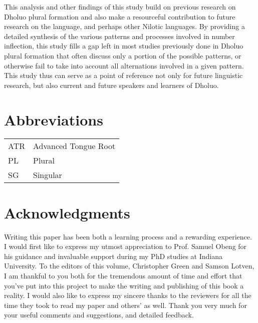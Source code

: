 \documentclass[output=paper,colorlinks,citecolor=brown]{langscibook}
\begin{document}
This analysis and other findings of this study build on previous research on Dholuo plural formation and also make a resourceful contribution to future research on the language, and perhaps other Nilotic languages. By providing a detailed synthesis of the various patterns and processes involved in number inflection, this study fills a gap left in most studies previously done in Dholuo plural formation that often discuss only a portion of the possible patterns, or otherwise fail to take into account all alternations involved in a given pattern. This study thus can serve as a point of reference not only for future linguistic research, but also current and future speakers and learners of Dholuo. 

\section*{Abbreviations}
\begin{tabularx}{.45\textwidth}{@{}lQ}
ATR & Advanced Tongue Root\\
PL  & Plural\\
SG & Singular \\
\end{tabularx}


\section*{Acknowledgments}
Writing this paper has been both a learning process and a rewarding experience. I would first like to express my utmost appreciation to Prof. Samuel Obeng for his guidance and invaluable support during my PhD studies at Indiana University. To the editors of this volume, Christopher Green and Samson Lotven, I am thankful to you both for the tremendous amount of time and effort that you’ve put into this project to make the writing and publishing of this book a reality. I would also like to express my sincere thanks to the reviewers for all the time they took to read my paper and others’ as well. Thank you very much for your useful comments and suggestions, and detailed feedback. 


{\sloppy\printbibliography[heading=subbibliography,notkeyword=this]}
\end{document}
